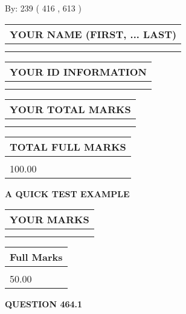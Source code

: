 \documentclass[12pt]{article}
\begin{document}
   
\hspace{1.0in} By: 
 239 ( 416 ,  613 )
   
   
   
   
\newpage 
\setcounter{page}{ 
   464001 } 
   
   
   
   
\noindent\begin{tabular}{|l|}
\hline
YOUR NAME (FIRST, ... LAST)  \\
\hline
 \\ 
 \\ 
\hline
\end{tabular}
\hspace{0.05in} \begin{tabular}{|l|}
\hline
 YOUR   ID   INFORMATION  \\
\hline
 \\ 
 \\ 
\hline
\end{tabular}
   
   
\vspace{0.2in}\noindent\begin{tabular}{|l|}
\hline
YOUR TOTAL MARKS  \\
\hline
 \\ 
 \\ 
\hline
\end{tabular}
\hspace{0.05in} \begin{tabular}{|l|}
\hline
TOTAL FULL MARKS  \\
\hline
 \\ 
100.00 \\
\hline
\end{tabular}
   
   
 \vspace{0.2in}
{\LARGE {\textbf{ A QUICK TEST EXAMPLE}}}
   
   
  
\vspace{0.2in}
  
\noindent\begin{tabular}{|l|}
\hline
 YOUR MARKS  \\
\hline
 \\ 
 \\ 
\hline
\end{tabular}
\hspace{0.05in} \begin{tabular}{|l|}
\hline
 Full Marks  \\
\hline
 \\ 
50.00 \\
\hline
\end{tabular}
{\textbf{\Large{QUESTION
464.1 
}}}
  
\end{document}
